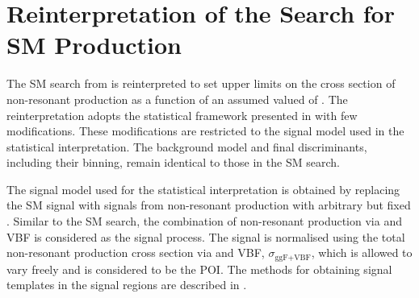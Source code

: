 \section{Reinterpretation of the Search for SM \HH Production}%
\label{sec:reinterpretation}

The SM \HH search from  is reinterpreted to set
upper limits on the cross section of non-resonant \HH production as a
function of an assumed valued of \klambda. %
The reinterpretation adopts the statistical framework presented in
 with few modifications. These
modifications are restricted to the signal model used in the
statistical interpretation. The background model and final
discriminants, including their binning, remain identical to those in
the SM \HH search.

The signal model used for the statistical interpretation is obtained
by replacing the SM \HH signal with signals from non-resonant \HH
production with arbitrary but fixed \klambda. Similar to the SM \HH
search, the combination of non-resonant \HH production via \ggF and
VBF is considered as the signal process. The signal is normalised
using the total non-resonant \HH production cross section via \ggF and
VBF, $\sigma_{\text{ggF+VBF}}$, which is allowed to vary freely and is
considered to be the POI.
The methods for obtaining signal templates in the signal regions are
described in .

